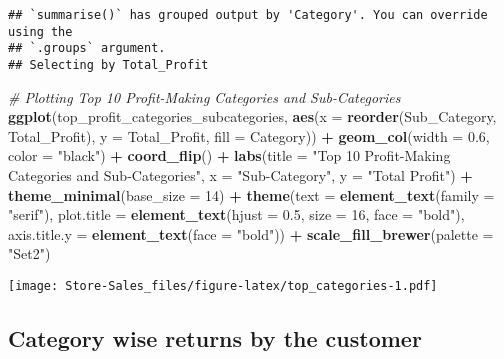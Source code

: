 \documentclass[
]{article}
\newenvironment{Shaded}{\begin{snugshade}}{\end{snugshade}}
\newcommand{\AttributeTok}[1]{\textcolor[rgb]{0.13,0.29,0.53}{#1}}
\newcommand{\CommentTok}[1]{\textcolor[rgb]{0.56,0.35,0.01}{\textit{#1}}}
\newcommand{\DecValTok}[1]{\textcolor[rgb]{0.00,0.00,0.81}{#1}}
\newcommand{\FloatTok}[1]{\textcolor[rgb]{0.00,0.00,0.81}{#1}}
\newcommand{\FunctionTok}[1]{\textcolor[rgb]{0.13,0.29,0.53}{\textbf{#1}}}
\newcommand{\NormalTok}[1]{#1}
\newcommand{\SpecialCharTok}[1]{\textcolor[rgb]{0.81,0.36,0.00}{\textbf{#1}}}
\newcommand{\StringTok}[1]{\textcolor[rgb]{0.31,0.60,0.02}{#1}}
\begin{document}
\begin{verbatim}
## `summarise()` has grouped output by 'Category'. You can override using the
## `.groups` argument.
## Selecting by Total_Profit
\end{verbatim}

\begin{Shaded}
\begin{Highlighting}[]
\CommentTok{\# Plotting Top 10 Profit{-}Making Categories and Sub{-}Categories}
\FunctionTok{ggplot}\NormalTok{(top\_profit\_categories\_subcategories, }\FunctionTok{aes}\NormalTok{(}\AttributeTok{x =} \FunctionTok{reorder}\NormalTok{(Sub\_Category, Total\_Profit), }\AttributeTok{y =}\NormalTok{ Total\_Profit, }\AttributeTok{fill =}\NormalTok{ Category)) }\SpecialCharTok{+}
  \FunctionTok{geom\_col}\NormalTok{(}\AttributeTok{width =} \FloatTok{0.6}\NormalTok{, }\AttributeTok{color =} \StringTok{"black"}\NormalTok{) }\SpecialCharTok{+}
  \FunctionTok{coord\_flip}\NormalTok{() }\SpecialCharTok{+}
  \FunctionTok{labs}\NormalTok{(}\AttributeTok{title =} \StringTok{"Top 10 Profit{-}Making Categories and Sub{-}Categories"}\NormalTok{, }\AttributeTok{x =} \StringTok{"Sub{-}Category"}\NormalTok{, }\AttributeTok{y =} \StringTok{"Total Profit"}\NormalTok{) }\SpecialCharTok{+}
  \FunctionTok{theme\_minimal}\NormalTok{(}\AttributeTok{base\_size =} \DecValTok{14}\NormalTok{) }\SpecialCharTok{+}
  \FunctionTok{theme}\NormalTok{(}\AttributeTok{text =} \FunctionTok{element\_text}\NormalTok{(}\AttributeTok{family =} \StringTok{"serif"}\NormalTok{),}
        \AttributeTok{plot.title =} \FunctionTok{element\_text}\NormalTok{(}\AttributeTok{hjust =} \FloatTok{0.5}\NormalTok{, }\AttributeTok{size =} \DecValTok{16}\NormalTok{, }\AttributeTok{face =} \StringTok{"bold"}\NormalTok{),}
        \AttributeTok{axis.title.y =} \FunctionTok{element\_text}\NormalTok{(}\AttributeTok{face =} \StringTok{"bold"}\NormalTok{)) }\SpecialCharTok{+}
  \FunctionTok{scale\_fill\_brewer}\NormalTok{(}\AttributeTok{palette =} \StringTok{"Set2"}\NormalTok{)}
\end{Highlighting}
\end{Shaded}

\texttt{[image: Store-Sales\_files/figure-latex/top\_categories-1.pdf]}

\hypertarget{category-wise-returns-by-the-customer}{%
\subsection{Category wise returns by the
customer}\label{category-wise-returns-by-the-customer}}
\end{document}
